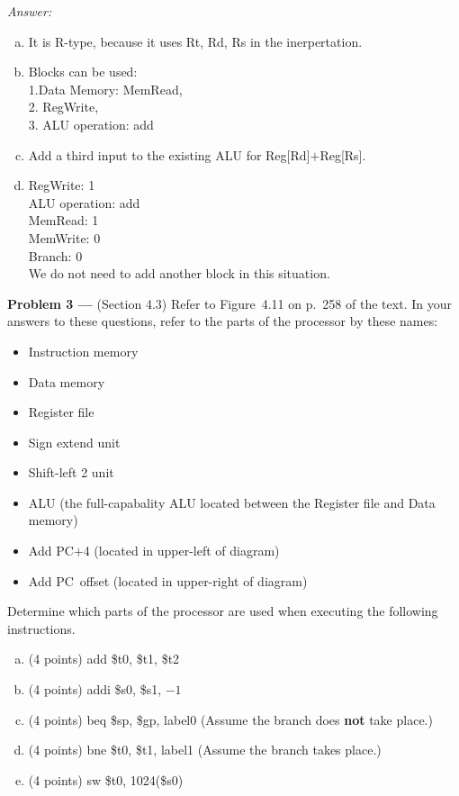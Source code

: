 \documentclass[11pt]{article}
\newcommand{\problem}[1]{\textbf{Problem #1 ---} }
\newcommand{\answer}{{\color{red}\textit{Answer: }}}
\begin{document}
\answer
\begin{enumerate}[(a)]
    \item It is R-type, because it uses Rt, Rd, Rs in the inerpertation.
    \item Blocks can be used: \\
            1.Data Memory: MemRead, \\ 
            2. RegWrite, \\
            3. ALU operation: add
    \item Add a third input to the existing ALU for
           Reg[Rd]$+$Reg[Rs].
    \item RegWrite: 1 \\
          ALU operation: add \\
          MemRead: 1 \\
          MemWrite: 0 \\
          Branch: 0\\
          We do not need to add another block in this situation.
\end{enumerate}
\newpage
\problem{3}(Section 4.3) Refer to Figure~4.11 on p.~258 of the text.  In your answers to these questions, refer to the parts of the processor by these names:
\begin{itemize}
    \item Instruction memory
    \item Data memory
    \item Register file
    \item Sign extend unit
    \item Shift-left 2 unit
    \item ALU (the full-capabality ALU  located between the Register file and Data memory)
    \item Add PC$+$4 (located in upper-left of diagram)
    \item Add PC~offset (located in upper-right of diagram)
\end{itemize}
Determine which parts of the processor are used when executing the following instructions.
\begin{enumerate}[(a)]
    \item(4 points) \textsf{add \$t0, \$t1, \$t2}
    \item(4 points) \textsf{addi \$s0, \$s1, $-1$}
    \item(4 points) \textsf{beq \$sp, \$gp, label0} (Assume the branch does \textbf{not} take place.)
    \item(4 points) \textsf{bne \$t0, \$t1, label1} (Assume the branch takes place.)
    \item(4 points) \textsf{sw \$t0, 1024(\$s0)}
\end{enumerate}
\end{document}
